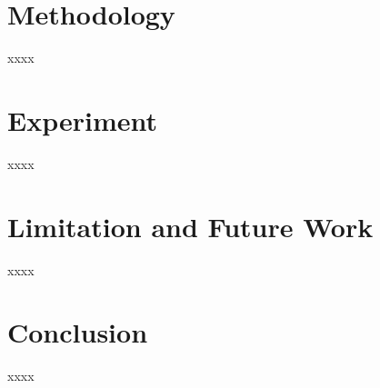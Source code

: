 \documentclass[conference]{IEEEtran}
\begin{document}
\section{Methodology} 
xxxx

\section{Experiment} 
xxxx

\section{Limitation and Future Work} 
xxxx

\section{Conclusion} 
xxxx

  

\end{document}
